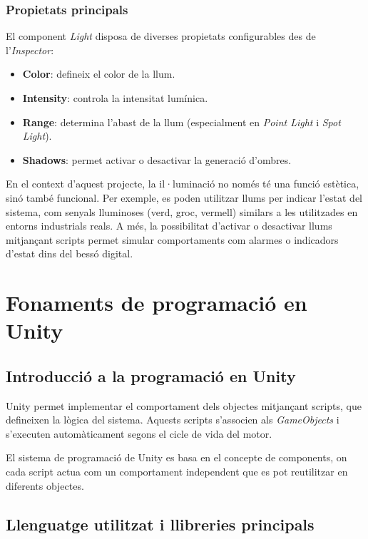 \documentclass[12pt,a4paper]{report}
\begin{document}
\subsubsection{Propietats principals}

El component \textit{Light} disposa de diverses propietats configurables des de l'\textit{Inspector}:

\begin{itemize}
\item \textbf{Color}: defineix el color de la llum.
\item \textbf{Intensity}: controla la intensitat lumínica.
\item \textbf{Range}: determina l'abast de la llum (especialment en \textit{Point Light} i \textit{Spot Light}).
\item \textbf{Shadows}: permet activar o desactivar la generació d'ombres.
\end{itemize}


En el context d'aquest projecte, la il·luminació no només té una funció estètica, sinó també funcional. Per exemple, es poden utilitzar llums per indicar l'estat del sistema, com senyals lluminoses (verd, groc, vermell) similars a les utilitzades en entorns industrials reals. A més, la possibilitat d'activar o desactivar llums mitjançant scripts permet simular comportaments com alarmes o indicadors d'estat dins del bessó digital.


\section{Fonaments de programació en Unity}

\subsection{Introducció a la programació en Unity}

Unity permet implementar el comportament dels objectes mitjançant scripts, que defineixen la lògica del sistema. Aquests scripts s'associen als \textit{GameObjects} i s'executen automàticament segons el cicle de vida del motor.

El sistema de programació de Unity es basa en el concepte de components, on cada script actua com un comportament independent que es pot reutilitzar en diferents objectes.

\subsection{Llenguatge utilitzat i llibreries principals}
\end{document}
